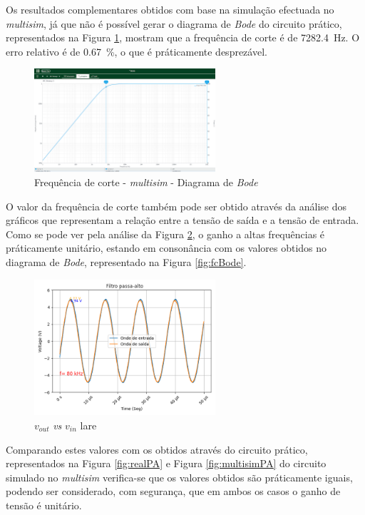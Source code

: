 Os resultados complementares obtidos com base na simulação efectuada no \textit{multisim}, já que não é possível gerar o diagrama de \textit{Bode} do circuito prático, representados na Figura \ref{fig:fcBodemultisim}, mostram que a frequência de corte é de \SI{7282.4}{\hertz}. O erro relativo é de \SI{0.67}{\percent}, o que é práticamente desprezável.

\begin{figure}[hbtp]
	\centering
	\includegraphics[width=0.6\textwidth]{figures/boda_HPF_fc.png}
	\caption{Frequência de corte - \textit{multisim} - Diagrama de \textit{Bode}}
	\label{fig:fcBodemultisim}
\end{figure}

O valor da frequência de corte também pode ser obtido através da análise dos gráficos que representam a relação entre a tensão de saída e a tensão de entrada. Como se pode ver pela análise da Figura \ref{fig:voutvinlare}, o ganho a altas frequências é práticamente unitário, estando em consonância com os valores obtidos no diagrama de \textit{Bode}, representado na Figura \ref{fig:fcBode}. 

\begin{figure}[hbtp]
	\centering
	\includegraphics[width=0.6\textwidth]{figures/filtro_passa-alto.png}
	\caption{$v_{out}$ \textit{vs} $v_{in}$ \acrshort{lare}}
	\label{fig:voutvinlare}
\end{figure}

Comparando estes valores com os obtidos através do circuito prático, representados na Figura \ref{fig:realPA} e Figura \ref{fig:multisimPA} do circuito simulado no \textit{multisim} verifica-se que os valores obtidos são práticamente iguais, podendo ser considerado, com segurança, que em ambos os casos o ganho de tensão é unitário. 

